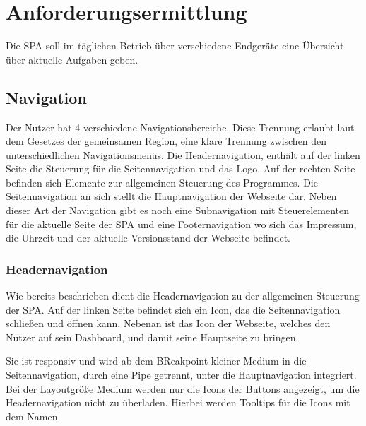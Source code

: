 \newpage
\section{Anforderungsermittlung} \label{infos}
Die \ac{SPA} soll im täglichen Betrieb über verschiedene Endgeräte eine Übersicht über aktuelle Aufgaben geben.

\subsection{Navigation}
Der Nutzer hat 4 verschiedene Navigationsbereiche.
Diese Trennung erlaubt laut dem Gesetzes der gemeinsamen Region, eine klare Trennung zwischen den unterschiedlichen Navigationsmenüs.
Die Headernavigation, enthält auf der linken Seite die Steuerung für die Seitennavigation und das Logo.
Auf der rechten Seite befinden sich Elemente zur allgemeinen Steuerung des Programmes.
Die Seitennavigation an sich stellt die Hauptnavigation der Webseite dar.
Neben dieser Art der Navigation gibt es noch eine Subnavigation mit Steuerelementen für die aktuelle Seite der \ac{SPA} und eine Footernavigation wo sich das Impressum, die Uhrzeit und der aktuelle Versionsstand der Webseite befindet.

\subsubsection{Headernavigation}

Wie bereits beschrieben dient die Headernavigation zu der allgemeinen Steuerung der \ac{SPA}.
Auf der linken Seite befindet sich ein Icon, das die Seitennavigation schließen und öffnen kann.
Nebenan ist das Icon der Webseite, welches den Nutzer auf sein Dashboard, und damit seine Hauptseite zu bringen.




Sie ist responsiv und wird ab dem BReakpoint kleiner Medium in die Seitennavigation, durch eine Pipe getrennt, unter die Hauptnavigation integriert.
Bei der Layoutgröße Medium werden nur die Icons der Buttons angezeigt, um die Headernavigation nicht zu überladen.
Hierbei werden Tooltips für die Icons mit dem Namen

